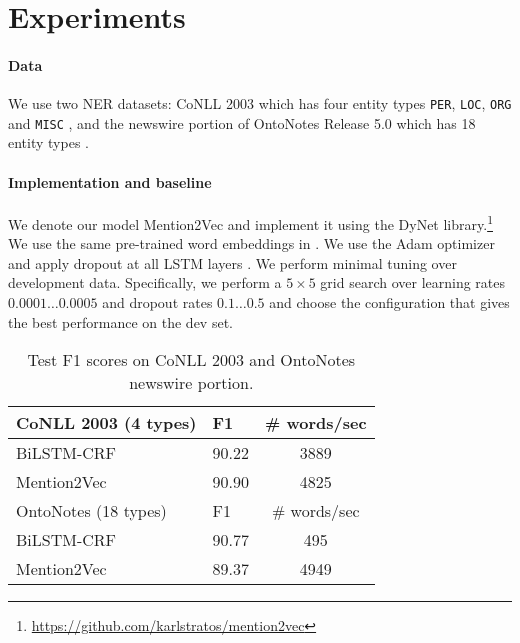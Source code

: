 \documentclass[11pt,letterpaper,UTF8]{article}
\newcommand{\by}{\ensuremath{\times}}
\begin{document}
\section{Experiments}
\label{sec:experiments}

\paragraph{Data}
We use two NER datasets: CoNLL 2003 which has four entity types \texttt{PER}, \texttt{LOC}, \texttt{ORG} and \texttt{MISC} \cite{tjong2003introduction},
and the newswire portion of OntoNotes Release 5.0 which has 18 entity types \cite{weischedel2013ontonotes}.

\paragraph{Implementation and baseline} We denote our model Mention2Vec and implement it
using the DyNet library.\footnote{\url{https://github.com/karlstratos/mention2vec}}
We use the same pre-trained word embeddings in .
We use the Adam optimizer \cite{kingma2014adam} and apply dropout at all LSTM layers \cite{hinton2012improving}.
We perform minimal tuning over development data. Specifically, we perform a $5 \by 5$ grid search over learning rates $0.0001 \ldots 0.0005$
and dropout rates $0.1 \ldots 0.5$ and choose the configuration that gives the best performance on the dev set.


\begin{table}[t!]
\begin{center}
{
\begin{tabular}{|l|l|c|}
\hline
CoNLL 2003 (4 types)               &   F1      &  \# words/sec\\
\hline
BiLSTM-CRF                         &  90.22    &   3889 \\
Mention2Vec                        &  90.90    &   4825 \\
\hline
\hline
OntoNotes (18 types)               &   F1      &  \# words/sec\\
\hline
BiLSTM-CRF                         &  90.77    &   495  \\
Mention2Vec                        &  89.37    &   4949 \\
\hline
\end{tabular}
\caption{Test F1 scores on CoNLL 2003 and OntoNotes newswire portion.}
\label{tab:comp1}
}
\end{center}
\vspace{-3mm}
\end{table}
\end{document}
